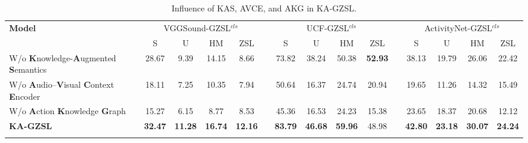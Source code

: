 \documentclass[lettersize,journal]{IEEEtran}
\begin{document}
\begin{table}[!t]
  \centering
  \caption{Influence of KAS, AVCE, and AKG in KA-GZSL.}
  \label{tab:component_ablation}
  \begin{tabular}{l cccc c cccc c cccc}
    \toprule[2pt]
    \multirow{2}{*}{\textbf{Model}}
    & \multicolumn{4}{c}{VGGSound-GZSL$^{\textit{cls}}$} & & \multicolumn{4}{c}{UCF-GZSL$^{\textit{cls}}$} & & \multicolumn{4}{c}{ActivityNet-GZSL$^{\textit{cls}}$} \\
    \cmidrule(lr){2-5} \cmidrule(lr){7-10} \cmidrule(lr){12-15}
    & S & U & HM & ZSL & & S & U & HM & ZSL & & S & U & HM & ZSL \\
    \midrule[1pt]
    W/o \textbf{K}nowledge-\textbf{A}ugmented \textbf{S}emantics & 28.67 & 9.39 & 14.15 & 8.66 & & 73.82 & 38.24 & 50.38 & \textbf{52.93} & & 38.13 & 19.79 & 26.06 & 22.42 \\
    W/o \textbf{A}udio--\textbf{V}isual \textbf{C}ontext \textbf{E}ncoder & 18.11 & 7.25 & 10.35 & 7.94 & & 50.64 & 16.37 & 24.74 & 20.94 & & 19.65 & 11.26 & 14.32 & 15.49 \\
    W/o \textbf{A}ction \textbf{K}nowledge \textbf{G}raph & 15.27 & 6.15 & 8.77 & 8.53 & & 45.36 & 16.53 & 24.23 & 15.38 & & 23.65 & 18.37 & 20.68 & 12.12 \\
    \noalign{\global\setlength{\oldaboverulesep}{\aboverulesep}}
    \noalign{\global\setlength{\oldbelowrulesep}{\belowrulesep}}
    \noalign{\global\setlength{\aboverulesep}{0pt}}
    \noalign{\global\setlength{\belowrulesep}{1.5pt}}
    \midrule[1pt]
    \rowcolor{gray!25}
    \textbf{KA-GZSL} & \textbf{32.47} & \textbf{11.28} & \textbf{16.74} & \textbf{12.16} & & \textbf{83.79} & \textbf{46.68} & \textbf{59.96} & 48.98 & & \textbf{42.80} & \textbf{23.18} & \textbf{30.07} & \textbf{24.24} \\
    \bottomrule[2pt]
    \noalign{\global\setlength{\aboverulesep}{\oldaboverulesep}}
    \noalign{\global\setlength{\belowrulesep}{\oldbelowrulesep}}
  \end{tabular}
\end{table}
\end{document}
